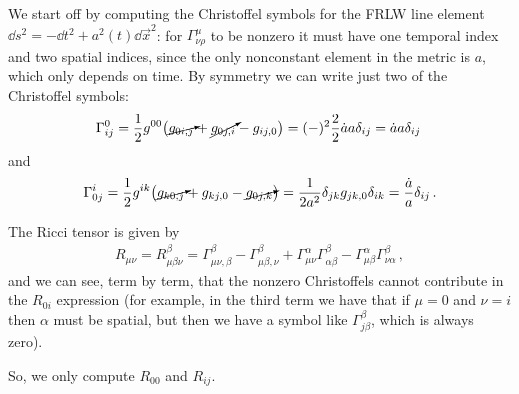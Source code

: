 \documentclass[main.tex]{subfiles}
\begin{document}
We start off by computing the Christoffel symbols for the FRLW line element \(\dd{s^2} = - \dd{t^2} + a^2(t) \dd{\vec{x}}^2\): for \(\Gamma^{\mu }_{\nu \rho }\) to be nonzero it must have one temporal index and two spatial indices, since the only nonconstant element in the metric is \(a\), which only depends on time. By symmetry we can write just two of the Christoffel symbols: 
%
\begin{align}
\Gamma^{0}_{ij} = \frac{1}{2} g^{00} \qty(\cancelto{}{g_{0i,j}} + \cancelto{}{g_{0j,i}} - g_{ij, 0}) = (-)^2 \frac{2}{2} \dot{a} a \delta_{ij} = \dot{a} a \delta_{ij} 
\,
\end{align}
%
and 
%
\begin{align}
\Gamma^{i}_{0j} = \frac{1}{2} g^{ik} \qty(\cancelto{}{g_{k0,j}} + g_{kj,0} - \cancelto{}{g_{0j,k}}) = \frac{1}{2a^2} \delta_{jk} g_{jk,0} \delta_{ik}  = \frac{\dot{a}}{a}  \delta_{ij} 
\,.
\end{align}

The Ricci tensor is given by 
%
\begin{align}
R_{\mu \nu } = R^{\beta }_{\mu \beta \nu } 
= \Gamma^{\beta }_{\mu \nu  , \beta } 
- \Gamma^{\beta }_{\mu \beta , \nu } 
+ \Gamma^{\alpha }_{\mu \nu } \Gamma^{\beta }_{\alpha \beta } 
- \Gamma^{\alpha }_{\mu \beta } \Gamma^{\beta }_{\nu \alpha }
\,,
\end{align}
%
and we can see, term by term, that the nonzero Christoffels cannot contribute in the \(R_{0i}\) expression (for example, in the third term we have that if \(\mu = 0\) and \(\nu = i\) then \(\alpha \) must be spatial, but then we have a symbol like \(\Gamma^{\beta }_{j \beta }\), which is always zero). 

So, we only compute \(R_{00} \) and \(R_{ij}\). 
\end{document}
